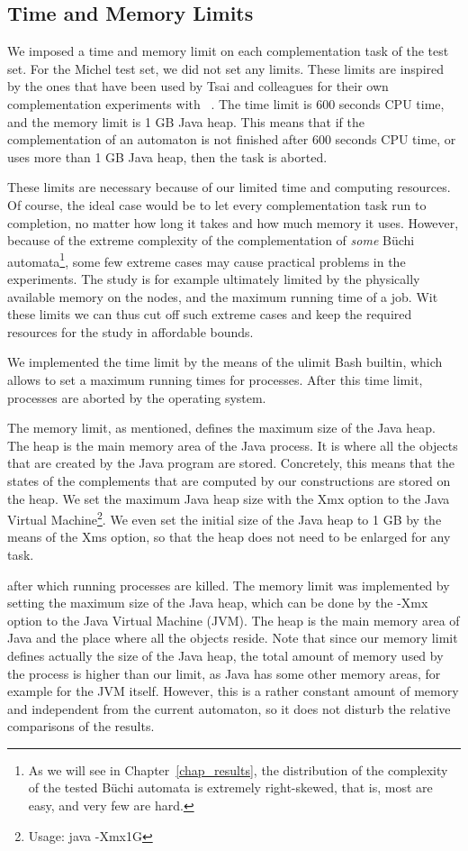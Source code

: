 \subsection{Time and Memory Limits}
\label{4_limits}
We imposed a time and memory limit on each complementation task of the \goal{} test set. For the Michel test set, we did not set any limits. These limits are inspired by the ones that have been used by Tsai and colleagues for their own complementation experiments with \goal~\cite{2011_tsai}. The time limit is 600 seconds CPU time, and the memory limit is 1 GB Java heap. This means that if the complementation of an automaton is not finished after 600 seconds CPU time, or uses more than 1 GB Java heap, then the task is aborted.

These limits are necessary because of our limited time and computing resources. Of course, the ideal case would be to let every complementation task run to completion, no matter how long it takes and how much memory it uses. However, because of the extreme complexity of the complementation of \textit{some} Büchi automata\footnote{As we will see in Chapter~\ref{chap_results}, the distribution of the complexity of the tested Büchi automata is extremely right-skewed, that is, most are easy, and very few are hard.}, some few extreme cases may cause practical problems in the experiments. The study is for example ultimately limited by the physically available memory on the nodes, and the maximum running time of a job. Wit these limits we can thus cut off such extreme cases and keep the required resources for the study in affordable bounds.

We implemented the time limit by the means of the \textsf{ulimit} Bash builtin, which allows to set a maximum running times for processes. After this time limit, processes are aborted by the operating system.

The memory limit, as mentioned, defines the maximum size of the Java heap. The heap is the main memory area of the Java process. It is where all the objects that are created by the Java program are stored. Concretely, this means that the states of the complements that are computed by our constructions are stored on the heap. We set the maximum Java heap size with the \textsf{Xmx} option to the Java Virtual Machine\footnote{Usage: \textsf{java -Xmx1G}}. We even set the initial size of the Java heap to 1 GB by the means of the \textsf{Xms} option, so that the heap does not need to be enlarged for any task.

after which running processes are killed. The memory limit was implemented by setting the maximum size of the Java heap, which can be done by the \textsf{-Xmx} option to the Java Virtual Machine (JVM). The heap is the main memory area of Java and the place where all the objects reside. Note that since our memory limit defines actually the size of the Java heap, the total amount of memory used by the process is higher than our limit, as Java has some other memory areas, for example for the JVM itself. However, this is a rather constant amount of memory and independent from the current automaton, so it does not disturb the relative comparisons of the results.

